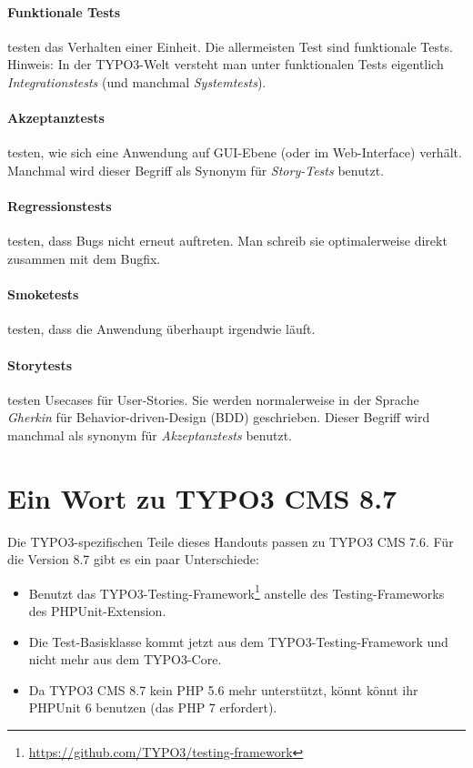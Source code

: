\documentclass[a4paper,10pt,headsepline]{scrartcl}
\begin{document}
\paragraph{Funktionale Tests} testen das Verhalten einer Einheit. Die allermeisten Test sind funktionale Tests. Hinweis: In der TYPO3-Welt versteht man unter funktionalen Tests eigentlich \emph{Integrationstests} (und manchmal \emph{Systemtests}).

\paragraph{Akzeptanztests} testen, wie sich eine Anwendung auf GUI-Ebene (oder im Web-Interface) verhält. Manchmal wird dieser Begriff als Synonym für \emph{Story-Tests} benutzt.

\paragraph{Regressionstests} testen, dass Bugs nicht erneut auftreten. Man schreib sie optimalerweise direkt zusammen mit dem Bugfix.

\paragraph{Smoketests} testen, dass die Anwendung überhaupt irgendwie läuft.

\paragraph{Storytests} testen Usecases für User-Stories. Sie werden normalerweise in der Sprache \emph{Gherkin} für Behavior-driven-Design (BDD) geschrieben. Dieser Begriff wird manchmal als synonym für \emph{Akzeptanztests} benutzt.



\pagebreak
\section{Ein Wort zu TYPO3 CMS 8.7}

Die TYPO3-spezifischen Teile dieses Handouts passen zu TYPO3 CMS 7.6. Für die Version 8.7 gibt es ein paar Unterschiede:

\begin{itemize}
  \item Benutzt das TYPO3-Testing-Framework\footnote{\url{https://github.com/TYPO3/testing-framework}} anstelle des Testing-Frameworks des PHPUnit-Extension.
  \item Die Test-Basisklasse kommt jetzt aus dem TYPO3-Testing-Framework und nicht mehr aus dem TYPO3-Core.
  \item Da TYPO3 CMS 8.7 kein PHP 5.6 mehr unterstützt, könnt könnt ihr PHPUnit 6 benutzen (das PHP 7 erfordert).
\end{itemize}
\end{document}
